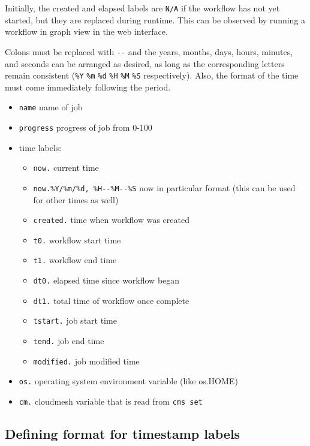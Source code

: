 Initially, the created and elapsed labels are \texttt{N/A} if the
workflow has not yet started, but they are replaced during runtime. This
can be observed by running a workflow in graph view in the web
interface.

Colons must be replaced with \texttt{-\/-} and the years, months, days,
hours, minutes, and seconds can be arranged as desired, as long as the
corresponding letters remain consistent (\texttt{\%Y} \texttt{\%m}
\texttt{\%d} \texttt{\%H} \texttt{\%M} \texttt{\%S} respectively). Also,
the format of the time must come immediately following the period.

\begin{itemize}
\tightlist
\item
  \texttt{name} name of job
\item
  \texttt{progress} progress of job from 0-100
\item
  time labels:

  \begin{itemize}
  \tightlist
  \item
    \texttt{now.} current time
  \item
    \texttt{now.\%Y/\%m/\%d,\ \%H-\/-\%M-\/-\%S} now in particular
    format (this can be used for other times as well)
  \item
    \texttt{created.} time when workflow was created
  \item
    \texttt{t0.} workflow start time
  \item
    \texttt{t1.} workflow end time
  \item
    \texttt{dt0.} elapsed time since workflow began
  \item
    \texttt{dt1.} total time of workflow once complete
  \item
    \texttt{tstart.} job start time
  \item
    \texttt{tend.} job end time
  \item
    \texttt{modified.} job modified time
  \end{itemize}
\item
  \texttt{os.} operating system environment variable (like os.HOME)
\item
  \texttt{cm.} cloudmesh variable that is read from \texttt{cms\ set}
\end{itemize}

\subsection{Defining format for timestamp
labels}\label{defining-format-for-timestamp-labels}

